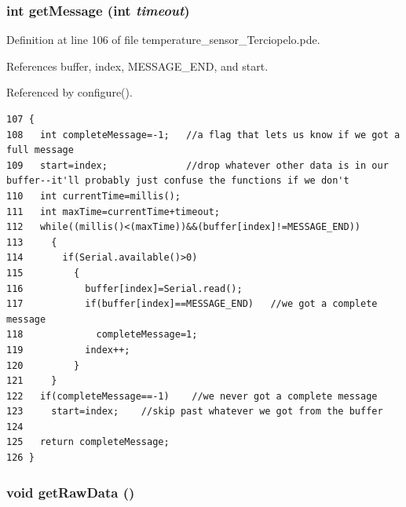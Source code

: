 \hypertarget{temperature__sensor___terciopelo_8pde_8f2521044963073c55b3c290fffd79e3}{
\subsubsection[{getMessage}]{\setlength{\rightskip}{0pt plus 5cm}int getMessage (int {\em timeout})}}
\label{temperature__sensor___terciopelo_8pde_8f2521044963073c55b3c290fffd79e3}




Definition at line 106 of file temperature\_\-sensor\_\-Terciopelo.pde.

References buffer, index, MESSAGE\_\-END, and start.

Referenced by configure().

\begin{Code}\begin{verbatim}107 {
108   int completeMessage=-1;   //a flag that lets us know if we got a full message
109   start=index;              //drop whatever other data is in our buffer--it'll probably just confuse the functions if we don't
110   int currentTime=millis();
111   int maxTime=currentTime+timeout;  
112   while((millis()<(maxTime))&&(buffer[index]!=MESSAGE_END))
113     {
114       if(Serial.available()>0)
115         {
116           buffer[index]=Serial.read();
117           if(buffer[index]==MESSAGE_END)   //we got a complete message
118             completeMessage=1;
119           index++;
120         }
121     }
122   if(completeMessage==-1)    //we never got a complete message
123     start=index;    //skip past whatever we got from the buffer
124   
125   return completeMessage;
126 }
\end{verbatim}
\end{Code}


\hypertarget{temperature__sensor___terciopelo_8pde_cfc975251dbc3a8c9a9b11f8df62cc41}{
\subsubsection[{getRawData}]{\setlength{\rightskip}{0pt plus 5cm}void getRawData ()}}
\label{temperature__sensor___terciopelo_8pde_cfc975251dbc3a8c9a9b11f8df62cc41}


